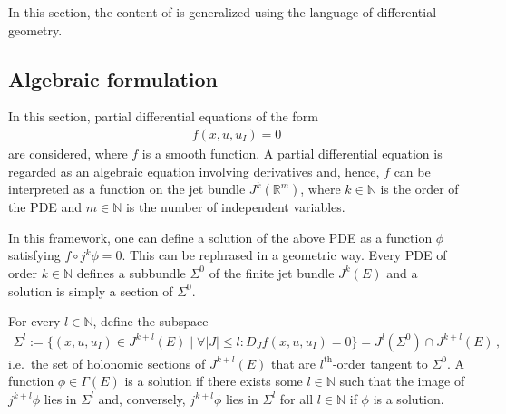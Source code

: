     In this section, the content of  is generalized using the language of differential geometry.

\subsection{Algebraic formulation}

    In this section, partial differential equations of the form
    \begin{gather}
        \label{var:pde_jet}
        f(x,u,u_I) = 0
    \end{gather}
    are considered, where $f$ is a smooth function. A partial differential equation is regarded as an algebraic equation involving derivatives and, hence, $f$ can be interpreted as a function on the jet bundle $J^k(\mathbb{R}^m)$, where $k\in\mathbb{N}$ is the order of the PDE and $m\in\mathbb{N}$ is the number of independent variables.

    In this framework, one can define a solution of the above PDE as a function $\phi$ satisfying $f\circ j^k\phi=0$. This can be rephrased in a geometric way. Every PDE of order $k\in\mathbb{N}$ defines a subbundle $\Sigma^0$ of the finite jet bundle $J^k(E)$ and a solution is simply a section of $\Sigma^0$.

    \begin{remark}
        For every $l\in\mathbb{N}$, define the subspace
        \begin{gather}
            \Sigma^l:=\{(x,u,u_I)\in J^{k+l}(E)\mid\forall|J|\leq l:D_Jf(x,u,u_I)= 0\} = J^l(\Sigma^0)\cap J^{k+l}(E)\,,
        \end{gather}
        i.e.~the set of holonomic sections of $J^{k+l}(E)$ that are $l^{\text{th}}$-order tangent to $\Sigma^0$. A function $\phi\in\Gamma(E)$ is a solution if there exists some $l\in\mathbb{N}$ such that the image of $j^{k+l}\phi$ lies in $\Sigma^l$ and, conversely, $j^{k+l}\phi$ lies in $\Sigma^l$ for all $l\in\mathbb{N}$ if $\phi$ is a solution.
    \end{remark}

